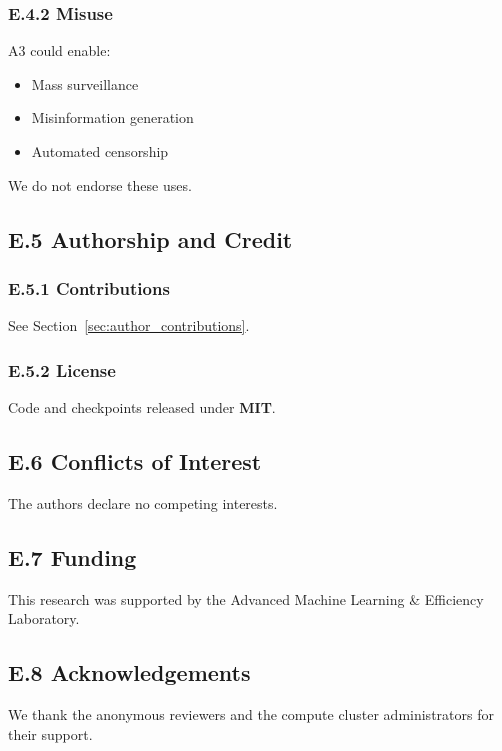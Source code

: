 \subsubsection{E.4.2 Misuse}

A3 could enable:

\begin{itemize}
\item Mass surveillance
\item Misinformation generation
\item Automated censorship

\end{itemize}
We do not endorse these uses.

\subsection{E.5 Authorship and Credit}

\subsubsection{E.5.1 Contributions}

See Section~\ref{sec:author_contributions}.

\subsubsection{E.5.2 License}

Code and checkpoints released under \textbf{MIT}.

\subsection{E.6 Conflicts of Interest}

The authors declare no competing interests.

\subsection{E.7 Funding}

This research was supported by the Advanced Machine Learning \& Efficiency Laboratory.

\subsection{E.8 Acknowledgements}

We thank the anonymous reviewers and the compute cluster administrators for their support.

